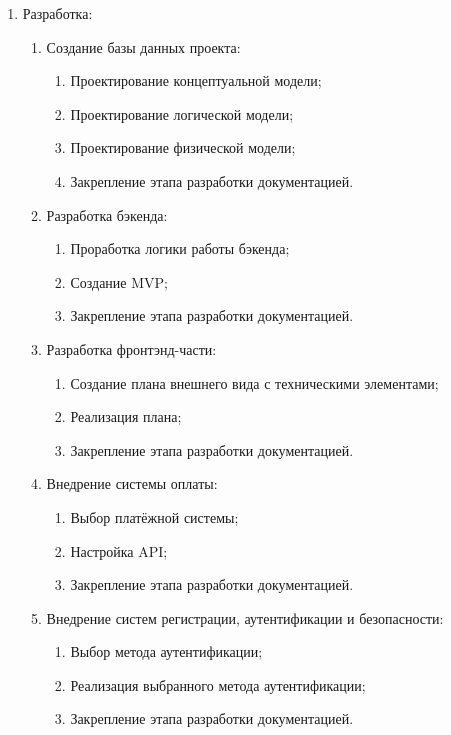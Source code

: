 \documentclass[14pt, russian]{matmex-diploma-custom}
\begin{document}
\begin{enumerate}
    \item Разработка:
    \begin{enumerate}
        \item Создание базы данных проекта:
        \begin{enumerate}
            \item Проектирование концептуальной модели;
            \item Проектирование логической модели;
            \item Проектирование физической модели;
            \item Закрепление этапа разработки документацией.
        \end{enumerate}
        \item Разработка бэкенда:
        \begin{enumerate}
            \item Проработка логики работы бэкенда;
            \item Создание MVP;
            \item Закрепление этапа разработки документацией.
        \end{enumerate}
        \item Разработка фронтэнд-части:
        \begin{enumerate}
            \item Создание плана внешнего вида с техническими элементами;
            \item Реализация плана;
            \item Закрепление этапа разработки документацией.
        \end{enumerate}
        \item Внедрение системы оплаты:
        \begin{enumerate}
            \item Выбор платёжной системы;
            \item Настройка API;
            \item Закрепление этапа разработки документацией.
        \end{enumerate}
        \item Внедрение систем регистрации, аутентификации и безопасности:
        \begin{enumerate}
            \item Выбор метода аутентификации;
            \item Реализация выбранного метода аутентификации;
            \item Закрепление этапа разработки документацией.
        \end{enumerate}
    \end{enumerate}


\end{enumerate}
\end{document}
